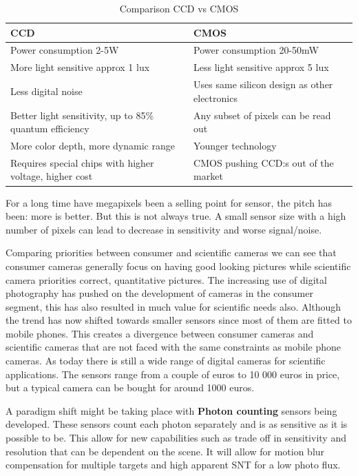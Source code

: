 \begin{table}[tb]
 	\label{tab:tablename}
 	\centering
 
 	\begin{tabular}{ll|c}
 	\hline
 
 	\hline
 	\textbf{CCD} & \textbf{CMOS} \\
 	\hline
 		 Power consumption 2-5W& 				Power consumption 20-50mW  \\
 		 More light sensitive approx 1 lux&	Less light sensitive approx 5 lux \\
 		 Less digital noise& Uses same silicon design as other electronics\\
 		 Better light sensitivity, up to 85\% quantum efficiency& Any subset of pixels can be read out  \\
 		 More color depth, more dynamic range& Younger technology\\
 		 Requires special chips with higher voltage, higher cost& CMOS pushing CCD:s out of the market \\
 	\hline
 	\end{tabular}
 	\caption{Comparison CCD vs CMOS}
 \end{table} 


For a long time have megapixels been a selling point for sensor, the pitch has been: more is better. But this is not always true. A small sensor size with a high number of pixels can lead to decrease in sensitivity and worse signal/noise. 

Comparing priorities between consumer and scientific cameras we can see that consumer cameras generally focus on having good looking pictures while scientific camera priorities correct, quantitative pictures. The increasing use of digital photography has pushed on the development of cameras in the consumer segment, this has also resulted in much value for scientific needs also. Although the trend has now shifted towards smaller sensors since most of them are fitted to mobile phones. This creates a divergence between consumer cameras and scientific cameras that are not faced with the same constraints as mobile phone cameras. As today there is still a wide range of digital cameras for scientific applications. The sensors range from a couple of euros to 10 000 euros in price, but a typical camera can be bought for around 1000 euros. 

A paradigm shift might be taking place with \textbf{Photon counting} sensors being developed. These sensors count each photon separately and is as sensitive as it is possible to be. This allow for new capabilities such as trade off in sensitivity and resolution that can be dependent on the scene. It will allow for motion blur compensation for multiple targets and high apparent SNT for a low photo flux. 

